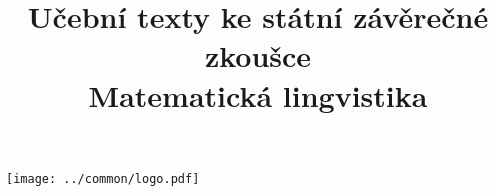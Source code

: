 \clearpage

\clearpage

\title{\LARGE Učební texty ke státní závěrečné zkoušce \\ Matematická lingvistika}




\maketitle

\vspace{10mm}
\begin{center}
\texttt{[image: ../common/logo.pdf]}
\end{center} 

\clearpage

\clearpage

\tableofcontents








